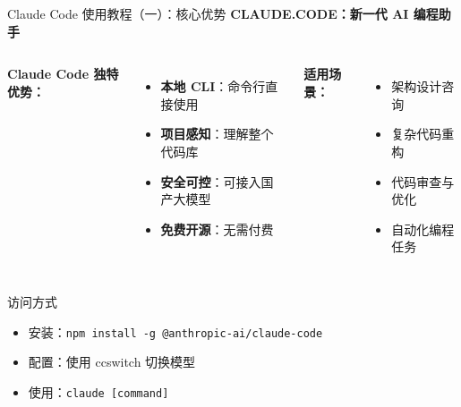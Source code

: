 \begin{frame}{Claude Code 使用教程（一）：核心优势}
	\textbf{CLAUDE.CODE：新一代 AI 编程助手}

	\vspace{0.3cm}

	\begin{columns}
		\textbf{Claude Code 独特优势：}
		\begin{itemize}
			\item \textbf{本地 CLI}：命令行直接使用
			\item \textbf{项目感知}：理解整个代码库
			\item \textbf{安全可控}：可接入国产大模型
			\item \textbf{免费开源}：无需付费
		\end{itemize}

		\textbf{适用场景：}
		\begin{itemize}
			\item 架构设计咨询
			\item 复杂代码重构
			\item 代码审查与优化
			\item 自动化编程任务
		\end{itemize}
	\end{columns}

	\vspace{0.3cm}

	\begin{block}{访问方式}
		\begin{itemize}
			\item 安装：\texttt{npm install -g @anthropic-ai/claude-code}
			\item 配置：使用 ccswitch 切换模型
			\item 使用：\texttt{claude [command]}
		\end{itemize}
	\end{block}
\end{frame}

